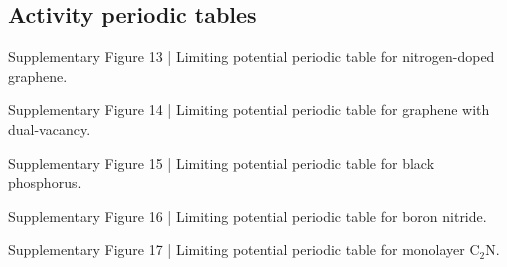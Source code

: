 \subsection{Activity periodic tables}


Supplementary Figure 13 | Limiting potential periodic table for nitrogen-doped graphene.


Supplementary Figure 14 | Limiting potential periodic table for graphene with dual-vacancy.


Supplementary Figure 15 | Limiting potential periodic table for black phosphorus.


Supplementary Figure 16 | Limiting potential periodic table for boron nitride.


Supplementary Figure 17 | Limiting potential periodic table for monolayer C$_2$N.

